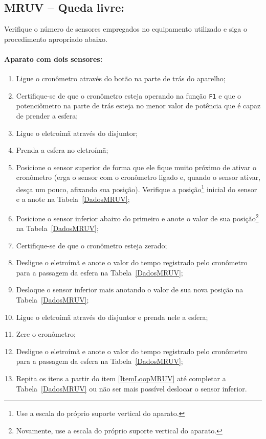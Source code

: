 \subsection{MRUV -- Queda livre:}

Verifique o número de sensores empregados no equipamento utilizado e siga o procedimento apropriado abaixo.

\paragraph{Aparato com dois sensores:}

\begin{enumerate}
    \item Ligue o cronômetro através do botão na parte de trás do aparelho;
    \item Certifique-se de que o cronômetro esteja operando na função \texttt{F1} e que o potenciômetro na parte de trás esteja no menor valor de potência que é capaz de prender a esfera;
    \item Ligue o eletroímã através do disjuntor;
	\item Prenda a esfera no eletroímã;
	\item Posicione o sensor superior de forma que ele fique muito próximo de ativar o cronômetro (erga o sensor com o cronômetro ligado e, quando o sensor ativar, desça um pouco, afixando sua posição). Verifique a posição\footnote{Use a escala do próprio suporte vertical do aparato.} inicial do sensor e a anote na Tabela~\ref{DadosMRUV};
	\item Posicione o sensor inferior  abaixo do primeiro e anote o valor de sua posição\footnote{Novamente, use a escala do próprio suporte vertical do aparato.} na Tabela~\ref{DadosMRUV};
	\item Certifique-se de que o cronômetro esteja zerado;
	\item Desligue o eletroímã e anote o valor do tempo registrado pelo cronômetro para a passagem da esfera na Tabela~\ref{DadosMRUV};
	\item Desloque o sensor inferior mais  anotando o valor de sua nova posição na Tabela~\ref{DadosMRUV};\label{ItemLoopMRUV}
	\item Ligue o eletroímã através do disjuntor e prenda nele a esfera;
	\item Zere o cronômetro;
	\item Desligue o eletroímã e anote o valor do tempo registrado pelo cronômetro para a passagem da esfera na Tabela~\ref{DadosMRUV};
	\item Repita os itens a partir do item \ref{ItemLoopMRUV} até completar a Tabela~\ref{DadosMRUV} ou não ser mais possível deslocar o sensor inferior.
\end{enumerate}

